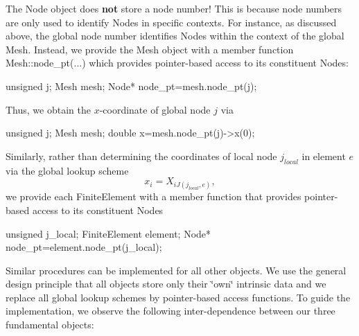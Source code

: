 The Node object does {\bfseries not} store a node number! This is because node numbers are only used to identify Nodes in specific contexts. For instance, as discussed above, the global node number identifies Nodes within the context of the global Mesh. Instead, we provide the Mesh object with a member function {\ttfamily Mesh\+::node\+\_\+pt}(...) which provides pointer-\/based access to its constituent Nodes\+: 
\begin{DoxyCode}
\textcolor{keywordtype}{unsigned} j;
Mesh mesh;
Node* node\_pt=mesh.node\_pt(j);
\end{DoxyCode}
 Thus, we obtain the $x$-\/coordinate of global node $j$ via 
\begin{DoxyCode}
\textcolor{keywordtype}{unsigned} j;
Mesh mesh;
\textcolor{keywordtype}{double} x=mesh.node\_pt(j)->x(0);
\end{DoxyCode}
 Similarly, rather than determining the coordinates of local node $j_{local}$ in element $e$ via the global lookup scheme \[ x_i = X_{iJ(j_{local},e)}, \] we provide each {\ttfamily Finite\+Element} with a member function that provides pointer-\/based access to its constituent Nodes 
\begin{DoxyCode}
\textcolor{keywordtype}{unsigned} j\_local;
FiniteElement element;
Node* node\_pt=element.node\_pt(j\_local);
\end{DoxyCode}


Similar procedures can be implemented for all other objects. We use the general design principle that all objects store only their \char`\"{}own\char`\"{} intrinsic data and we replace all global lookup schemes by pointer-\/based access functions. To guide the implementation, we observe the following inter-\/dependence between our three fundamental objects\+:


